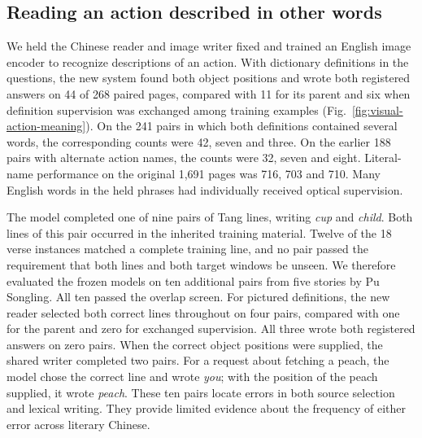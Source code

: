 \documentclass[12pt,a4paper]{article}
\providecommand{\DIFadd}[1]{{\protect\color{blue} \sf #1}} %
\begin{document}
\subsection*{\DIFadd{Reading an action described in other words}}
\DIFadd{We held the Chinese reader and image writer fixed and trained an English image encoder to recognize descriptions of an action. With dictionary definitions in the questions, the new system found both object positions and wrote both registered answers on 44 of 268 paired pages, compared with 11 for its parent and six when definition supervision was exchanged among training examples (Fig.~\ref{fig:visual-action-meaning}). On the 241 pairs in which both definitions contained several words, the corresponding counts were 42, seven and three. On the earlier 188 pairs with alternate action names, the counts were 32, seven and eight. Literal-name performance on the original 1,691 pages was 716, 703 and 710. Many English words in the held phrases had individually received optical supervision.
}

\DIFadd{The model completed one of nine pairs of Tang lines, writing \textit{cup} and \textit{child}. Both lines of this pair occurred in the inherited training material. Twelve of the 18 verse instances matched a complete training line, and no pair passed the requirement that both lines and both target windows be unseen. We therefore evaluated the frozen models on ten additional pairs from five stories by Pu Songling. All ten passed the overlap screen. For pictured definitions, the new reader selected both correct lines throughout on four pairs, compared with one for the parent and zero for exchanged supervision. All three wrote both registered answers on zero pairs. When the correct object positions were supplied, the shared writer completed two pairs. For a request about fetching a peach, the model chose the correct line and wrote \textit{you}; with the position of the peach supplied, it wrote \textit{peach}. These ten pairs locate errors in both source selection and lexical writing. They provide limited evidence about the frequency of either error across literary Chinese.
}
\end{document}
